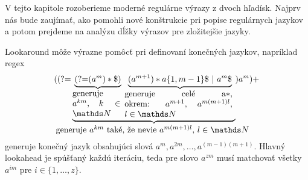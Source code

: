 V tejto kapitole rozoberieme moderné regulárne výrazy z dvoch hľadísk. Najprv nás bude zaujímať, ako pomohli nové konštrukcie pri popise regulárnych jazykov a potom prejdeme na analýzu dĺžky výrazov pre zložitejšie jazyky.

Lookaround môže výrazne pomôcť pri definovaní konečných jazykov, napríklad regex 
$$(\lookahead 
\underbrace{
	\underbrace{
		\lookahead (a^m)*\$ )
	}_{ \text{\normalsize \parbox{2cm}{generuje $a^{km}$, $k\in\N$} } }
	\underbrace{
		(a^{m+1})* a\lbrace 1,m-1\rbrace \$ ~|~ a^m \$ 
	}_{ \text{\normalsize \parbox{4.5cm}{generuje celé a$*$, okrem: $a^{m+1}$, $a^{m(m+1)l}$, $l\in\N$} } }
}_{\mathclap{ \text{\normalsize generuje $a^{km}$ také, že nevie $a^{m(m+1)l}$, $l\in\N$ } } }
) a^m)+$$
generuje konečný jazyk obsahujúci slová $a^m,\allowbreak a^{2m},\dots,\allowbreak a^{(m-1)(m+1)}$. Hlavný lookahead je spúšťaný každú iteráciu, teda pre slovo $a^{zm}$ musí matchovať všetky $a^{im}$ pre $i\in\lbrace 1,\dots,z\rbrace$.
